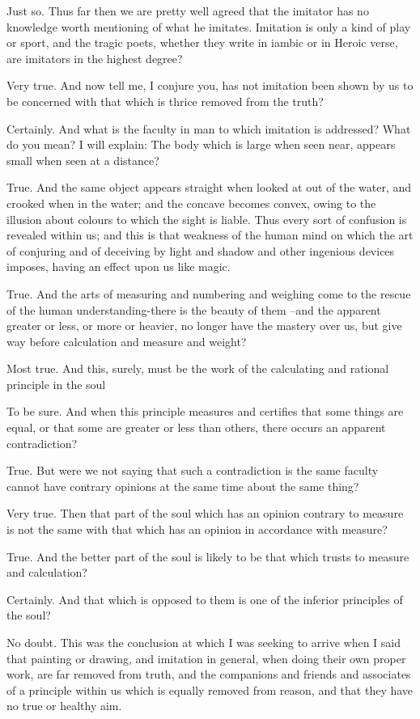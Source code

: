 Just so.
Thus far then we are pretty well agreed that the imitator has no knowledge worth mentioning of what he imitates. Imitation is only a kind of play or sport, and the tragic poets, whether they write in iambic or in Heroic verse, are imitators in the highest degree?

Very true.
And now tell me, I conjure you, has not imitation been shown by us to be concerned with that which is thrice removed from the truth?

Certainly.
And what is the faculty in man to which imitation is addressed?
What do you mean?
I will explain: The body which is large when seen near, appears small when seen at a distance?

True.
And the same object appears straight when looked at out of the water, and crooked when in the water; and the concave becomes convex, owing to the illusion about colours to which the sight is liable. Thus every sort of confusion is revealed within us; and this is that weakness of the human mind on which the art of conjuring and of deceiving by light and shadow and other ingenious devices imposes, having an effect upon us like magic.

True.
And the arts of measuring and numbering and weighing come to the rescue of the human understanding-there is the beauty of them --and the apparent greater or less, or more or heavier, no longer have the mastery over us, but give way before calculation and measure and weight?

Most true.
And this, surely, must be the work of the calculating and rational principle in the soul

To be sure.
And when this principle measures and certifies that some things are equal, or that some are greater or less than others, there occurs an apparent contradiction?

True.
But were we not saying that such a contradiction is the same faculty cannot have contrary opinions at the same time about the same thing?

Very true.
Then that part of the soul which has an opinion contrary to measure is not the same with that which has an opinion in accordance with measure?

True.
And the better part of the soul is likely to be that which trusts to measure and calculation?

Certainly.
And that which is opposed to them is one of the inferior principles of the soul?

No doubt.
This was the conclusion at which I was seeking to arrive when I said that painting or drawing, and imitation in general, when doing their own proper work, are far removed from truth, and the companions and friends and associates of a principle within us which is equally removed from reason, and that they have no true or healthy aim.

